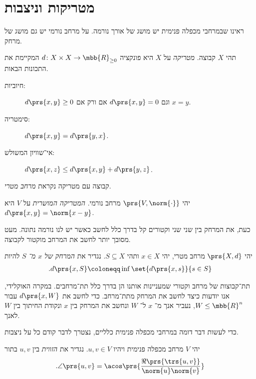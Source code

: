 \documentclass[a4paper,10pt,twoside,openany]{book}
\begin{document}
\section{מטריקות וניצבות}

ראינו שבמרחבי מכפלה פנימית יש מושג של אורך%
\textemdash
נורמה.
על מרחב נורמי יש גם מושג של מרחק.

\begin{definition}[מטריקה]
תהי
$X$
קבוצה.
\emph{מטריקה}
על
$X$
היא פונקציה
$d \colon X \times X \to \mbb{R}_{\geq 0}$
המקיימת את התכונות הבאות.
\begin{description}
\item[חיוביות:]
$d\prs{x,y} \geq 0$
וגם
$d\prs{x,y} = 0$
אם ורק אם
$x = y$.

\item[סימטריה:]
$d\prs{x,y} = d\prs{y,x}$.

\item[אי־שוויון המשולש:]
$d\prs{x,z} \leq d\prs{x,y} + d\prs{y,z}$.
\end{description}

קבוצה עם מטריקה נקראת
\emph{מרחב מטרי}.
\end{definition}

\begin{definition}
יהי
$\prs{V,\norm{\cdot}}$
מרחב נורמי.
\emph{המטריקה המושרית}
על
$V$
היא
$d\prs{x,y} = \norm{x-y}$.
\end{definition}

כעת, את המרחק בין שני שני וקטורים קל בדרך כלל לחשב כאשר יש לנו נורמה נתונה. מעט מסובך יותר לחשב את המרחב מוקטור לקבוצה.

\begin{definition}
יהי
$\prs{X,d}$
מרחב מטרי, יהי
$x \in X$
ותהי
$S \subseteq X$.
נגדיר את
\emph{המרחק של
$x$
מ־%
$S$}
להיות
\begin{align*}
\text{.} d\prs{x,S} \coloneqq \inf\set{d\prs{x,s}}{s \in S}
\end{align*}
\end{definition}

תת־קבוצות של מרחב וקטורי שמעניינות אותנו הן בדרך כלל תת־מרחבים. במקרה האוקלידי, אנו יודעות כיצד לחשב את המרחק מתת־מרחב. כדי לחשב את
$d\prs{x,W}$
עבור
$W \leq \mbb{R}^n$,
נעביר אנך מ־%
$x$
ל־%
$W$
ונחשב את המרחק בין
$x$
ונקודת החיתוך בין
$W$
לאנך.

כדי לעשות דבר דומה במרחבי מכפלה פנימית כלליים, נצטרך לדבר קודם כל על ניצבות.

\begin{definition}
יהי
$V$
מרחב מכפלה פנימית ויהיו
$u,v \in V$.
נגדיר את
\emph{הזווית}
בין
$u,v$
בתור
\[\text{.} \angle\prs{u,v} = \acos\prs{{\frac{\Re\prs{\trs{u,v}}}{\norm{u} \norm{v}}}}\]
\end{definition}
\end{document}

